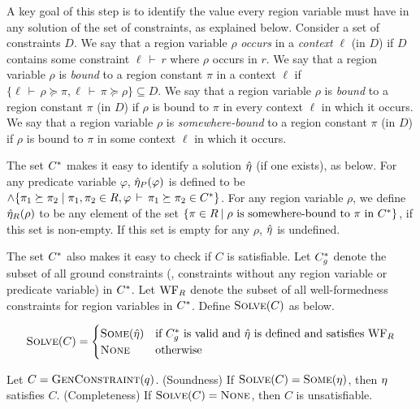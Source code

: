 \documentclass[a4paper,UKenglish]{lipics-v2018}
\newcommand{\conj}{\wedge}
\newcommand{\isvalid}[2]{#1\,\vdash\,#2}
\newcommand{\outlives}{\succeq}
\newcommand{\regionConstants}{R}
\begin{document}
A key goal of this step is to identify the value every region variable
must have in any solution of the set of constraints, as explained
below.  Consider a set of constraints $D$. We say that a region
variable $\rho$ \emph{occurs} in a \emph{context} $\ell$ (in $D$) if
$D$ contains some constraint $\isvalid{\ell}{r}$ where $\rho$ occurs
in $r$.  We say that a region variable $\rho$ is \emph{bound} to a
region constant $\pi$ in a context $\ell$ if $\{ \isvalid{\ell}{\rho
\outlives \pi}, \isvalid{\ell}{\pi \outlives \rho} \} \subseteq D$.
We say that a region variable $\rho$ is \emph{bound} to a region
constant $\pi$ (in $D$) if $\rho$ is bound to $\pi$ in every context
$\ell$ in which it occurs.  We say that a region variable $\rho$ is
\emph{somewhere-bound} to a region constant $\pi$ (in $D$) if $\rho$
is bound to $\pi$ in some context $\ell$ in which it occurs.

The set ${C}^*$ makes it easy to identify a solution $\hat{\eta}$ (if
one exists), as below.  For any predicate variable $\varphi$,
$\hat{\eta}_P(\varphi)$ is defined to be $\conj \{ \pi_1 \outlives \pi_2
\;|\; \pi_1, \pi_2 \in \regionConstants, \isvalid{\varphi}{\pi_1
\outlives \pi_2} \in \saturate{C} \}$.  For any region variable
$\rho$, we define $\hat{\eta}_R(\rho)$ to be any element of the set $\{
  \pi \in \regionConstants \:|\; \rho \text{ is somewhere-bound to }
  \pi \text{ in } \saturate{C} \}$, if this set is non-empty. If this
set is empty for any $\rho$, $\hat{\eta}$ is undefined.

The set ${C}^*$ also makes it easy to check if $C$ is satisfiable.
Let ${C}^*_g$ denote the subset of all ground constraints
(\ie, constraints without any region variable or predicate variable)
in ${C}^*$. Let $\text{WF}_R$ denote the subset of all well-formedness
constraints for region variables in ${C}^*$.
Define $\textsc{Solve}(C)$ as below.

\[
\textsc{Solve}(C) = 
\begin{cases}
\textsc{Some} (\hat{\eta}) & \textrm{if ${C}^*_g$ is valid and $\hat{\eta}$ is defined and satisfies $\text{WF}_R$} \\
\textsc{None} & \textrm{otherwise}
\end{cases}
\]

\begin{theorem}
\label{thm:constraint-solver-sc}
  Let $C = \textsc{GenConstraint}(q)$.  (Soundness) If $\textsc{Solve}(C) =
  \textsc{Some}(\eta)$, then $\eta$ satisfies $C$.  (Completeness)
  If $\textsc{Solve}(C) = \textsc{None}$, then $C$ is unsatisfiable.
\end{theorem}
\end{document}
